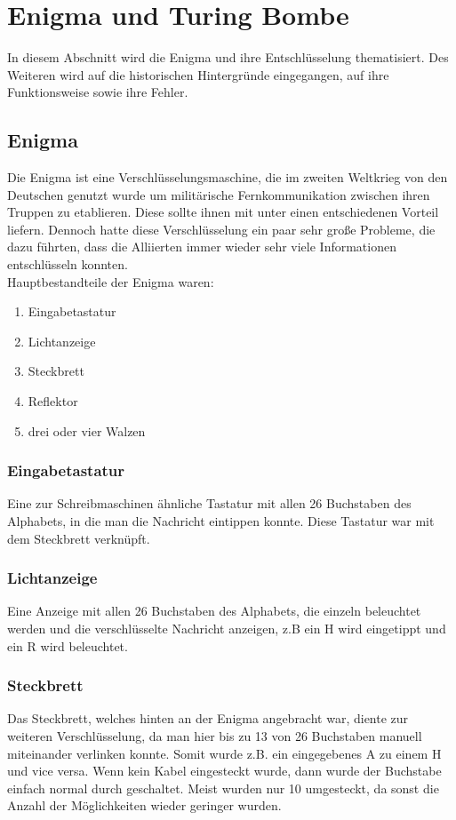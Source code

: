 \section{Enigma und Turing Bombe}
\label{enigma}
In diesem Abschnitt wird die Enigma und ihre Entschlüsselung thematisiert. Des Weiteren wird auf die historischen Hintergründe eingegangen, auf ihre Funktionsweise sowie ihre Fehler.

\subsection{Enigma}
Die Enigma ist eine Verschlüsselungsmaschine, die im zweiten Weltkrieg von den Deutschen genutzt wurde um militärische Fernkommunikation zwischen ihren Truppen zu etablieren. Diese sollte ihnen mit unter einen entschiedenen Vorteil liefern. Dennoch hatte diese Verschlüsselung ein paar sehr große Probleme, die dazu führten, dass die Alliierten immer wieder sehr viele Informationen entschlüsseln konnten.\\
Hauptbestandteile der Enigma waren:
\begin{enumerate}
	\item Eingabetastatur
	\item Lichtanzeige
	\item Steckbrett
	\item Reflektor
	\item drei oder vier Walzen
\end{enumerate}

\subsubsection{Eingabetastatur}
Eine zur Schreibmaschinen ähnliche Tastatur mit allen 26 Buchstaben des Alphabets, in die man die Nachricht eintippen konnte. Diese Tastatur war mit dem Steckbrett verknüpft.

\subsubsection{Lichtanzeige}
Eine Anzeige mit allen 26 Buchstaben des Alphabets, die einzeln beleuchtet werden und die verschlüsselte Nachricht anzeigen, z.B ein H wird eingetippt und ein R wird beleuchtet.

\subsubsection{Steckbrett}
\label{sec:steck}
Das Steckbrett, welches hinten an der Enigma angebracht war, diente zur weiteren Verschlüsselung, da man hier bis zu 13 von 26 Buchstaben manuell miteinander verlinken konnte. Somit wurde z.B. ein eingegebenes A zu einem H und vice versa. Wenn kein Kabel eingesteckt wurde, dann wurde der Buchstabe einfach normal durch geschaltet. Meist wurden nur 10 umgesteckt, da sonst die Anzahl der Möglichkeiten wieder geringer wurden.

